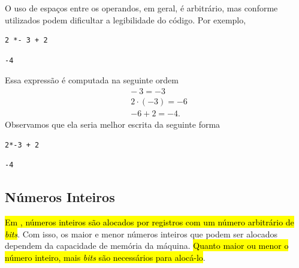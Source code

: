 \begin{obs}
  O uso de espaços entre os operandos, em geral, é arbitrário, mas conforme utilizados podem dificultar a legibilidade do código. Por exemplo,
\begin{lstlisting}
2 *- 3 + 2
\end{lstlisting}

\begin{verbatim}
-4
\end{verbatim}

  Essa expressão é computada na seguinte ordem
  \begin{align}
    & -~3 = -3 \\
    & 2\cdot(-3) = -6 \\
    & -6 + 2 = -4.
  \end{align}
  Observamos que ela seria melhor escrita da seguinte forma

\begin{lstlisting}
2*-3 + 2
\end{lstlisting}

\begin{verbatim}
-4
\end{verbatim}

\end{obs}

\subsection{Números Inteiros}

\hl{Em {\python}, números inteiros são alocados por registros com um número arbitrário de \textit{bits}}. Com isso, os maior e menor números inteiros que podem ser alocados dependem da capacidade de memória da máquina. \hl{Quanto maior ou menor o número inteiro, mais \textit{bits} são necessários para alocá-lo}.

